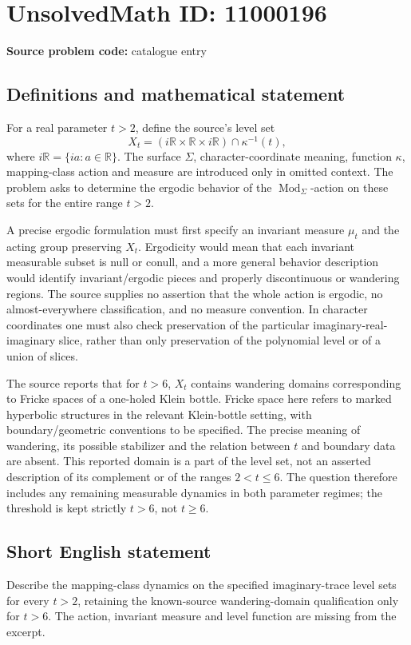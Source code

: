 \documentclass[11pt]{article}
\newcommand{\R}{\mathbb{R}}
\begin{document}
\section*{UnsolvedMath ID: 11000196}
\textbf{Source problem code:} catalogue entry
\subsection{Definitions and mathematical statement}
For a real parameter \(t>2\), define the source's level set
\[X_t=(i\R\times\R\times i\R)\cap\kappa^{-1}(t),\]
where \(i\R=\{ia:a\in\R\}\). The surface \(\Sigma\), character-coordinate meaning, function \(\kappa\), mapping-class action and measure are introduced only in omitted context. The problem asks to determine the ergodic behavior of the \(\operatorname{Mod}_\Sigma\)-action on these sets for the entire range \(t>2\).

A precise ergodic formulation must first specify an invariant measure \(\mu_t\) and the acting group preserving \(X_t\). Ergodicity would mean that each invariant measurable subset is null or conull, and a more general behavior description would identify invariant/ergodic pieces and properly discontinuous or wandering regions. The source supplies no assertion that the whole action is ergodic, no almost-everywhere classification, and no measure convention. In character coordinates one must also check preservation of the particular imaginary-real-imaginary slice, rather than only preservation of the polynomial level or of a union of slices.

The source reports that for \(t>6\), \(X_t\) contains wandering domains corresponding to Fricke spaces of a one-holed Klein bottle. Fricke space here refers to marked hyperbolic structures in the relevant Klein-bottle setting, with boundary/geometric conventions to be specified. The precise meaning of wandering, its possible stabilizer and the relation between \(t\) and boundary data are absent. This reported domain is a part of the level set, not an asserted description of its complement or of the ranges \(2<t\leq6\). The question therefore includes any remaining measurable dynamics in both parameter regimes; the threshold is kept strictly \(t>6\), not \(t\geq6\).
\subsection{Short English statement}
Describe the mapping-class dynamics on the specified imaginary-trace level sets for every \(t>2\), retaining the known-source wandering-domain qualification only for \(t>6\). The action, invariant measure and level function are missing from the excerpt.
\end{document}
